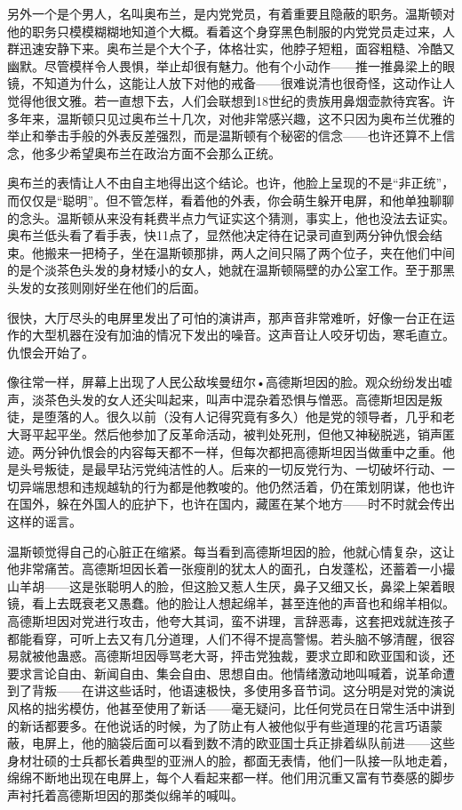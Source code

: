 另外一个是个男人，名叫奥布兰，是内党党员，有着重要且隐蔽的职务。温斯顿对他的职务只模模糊糊地知道个大概。看着这个身穿黑色制服的内党党员走过来，人群迅速安静下来。奥布兰是个大个子，体格壮实，他脖子短粗，面容粗糙、冷酷又幽默。尽管模样令人畏惧，举止却很有魅力。他有个小动作------推一推鼻梁上的眼镜，不知道为什么，这能让人放下对他的戒备------很难说清也很奇怪，这动作让人觉得他很文雅。若一直想下去，人们会联想到18世纪的贵族用鼻烟壶款待宾客。许多年来，温斯顿只见过奥布兰十几次，对他非常感兴趣，这不只因为奥布兰优雅的举止和拳击手般的外表反差强烈，而是温斯顿有个秘密的信念------也许还算不上信念，他多少希望奥布兰在政治方面不会那么正统。

奥布兰的表情让人不由自主地得出这个结论。也许，他脸上呈现的不是``非正统''，而仅仅是``聪明''。但不管怎样，看着他的外表，你会萌生躲开电屏，和他单独聊聊的念头。温斯顿从来没有耗费半点力气证实这个猜测，事实上，他也没法去证实。奥布兰低头看了看手表，快11点了，显然他决定待在记录司直到两分钟仇恨会结束。他搬来一把椅子，坐在温斯顿那排，两人之间只隔了两个位子，夹在他们中间的是个淡茶色头发的身材矮小的女人，她就在温斯顿隔壁的办公室工作。至于那黑头发的女孩则刚好坐在他们的后面。

很快，大厅尽头的电屏里发出了可怕的演讲声，那声音非常难听，好像一台正在运作的大型机器在没有加油的情况下发出的噪音。这声音让人咬牙切齿，寒毛直立。仇恨会开始了。

像往常一样，屏幕上出现了人民公敌埃曼纽尔•高德斯坦因的脸。观众纷纷发出嘘声，淡茶色头发的女人还尖叫起来，叫声中混杂着恐惧与憎恶。高德斯坦因是叛徒，是堕落的人。很久以前（没有人记得究竟有多久）他是党的领导者，几乎和老大哥平起平坐。然后他参加了反革命活动，被判处死刑，但他又神秘脱逃，销声匿迹。两分钟仇恨会的内容每天都不一样，但每次都把高德斯坦因当做重中之重。他是头号叛徒，是最早玷污党纯洁性的人。后来的一切反党行为、一切破坏行动、一切异端思想和违规越轨的行为都是他教唆的。他仍然活着，仍在策划阴谋，他也许在国外，躲在外国人的庇护下，也许在国内，藏匿在某个地方------时不时就会传出这样的谣言。

温斯顿觉得自己的心脏正在缩紧。每当看到高德斯坦因的脸，他就心情复杂，这让他非常痛苦。高德斯坦因长着一张瘦削的犹太人的面孔，白发蓬松，还蓄着一小撮山羊胡------这是张聪明人的脸，但这脸又惹人生厌，鼻子又细又长，鼻梁上架着眼镜，看上去既衰老又愚蠢。他的脸让人想起绵羊，甚至连他的声音也和绵羊相似。高德斯坦因对党进行攻击，他夸大其词，蛮不讲理，言辞恶毒，这套把戏就连孩子都能看穿，可听上去又有几分道理，人们不得不提高警惕。若头脑不够清醒，很容易就被他蛊惑。高德斯坦因辱骂老大哥，抨击党独裁，要求立即和欧亚国和谈，还要求言论自由、新闻自由、集会自由、思想自由。他情绪激动地叫喊着，说革命遭到了背叛------在讲这些话时，他语速极快，多使用多音节词。这分明是对党的演说风格的拙劣模仿，他甚至使用了新话------毫无疑问，比任何党员在日常生活中讲到的新话都要多。在他说话的时候，为了防止有人被他似乎有些道理的花言巧语蒙蔽，电屏上，他的脑袋后面可以看到数不清的欧亚国士兵正排着纵队前进------这些身材壮硕的士兵都长着典型的亚洲人的脸，都面无表情，他们一队接一队地走着，绵绵不断地出现在电屏上，每个人看起来都一样。他们用沉重又富有节奏感的脚步声衬托着高德斯坦因的那类似绵羊的喊叫。

